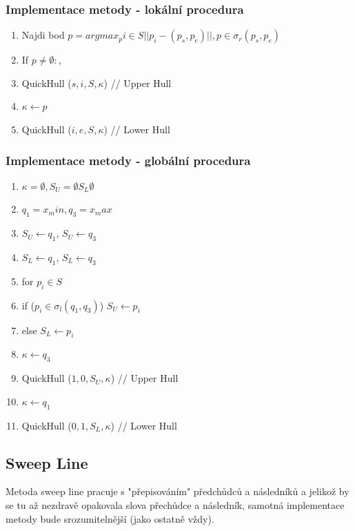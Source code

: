 \documentclass[a4paper, 12pt]{article}
\begin{document}
\subsubsection{Implementace metody - lokální procedura}
\begin{enumerate}
	\item Najdi bod $p = arg max_pi \in S ||p_i - (p_s, p_e)||, p \in \sigma_r (p_s, p_e)$
	\item If $ p\neq\emptyset:$,
	\item \hspace {1cm} QuickHull ($s,i,S,\kappa$) // Upper Hull
	\item \hspace {1cm} $\kappa \longleftarrow p$
	\item \hspace {1cm} QuickHull ($i,e,S,\kappa$) // Lower Hull
\end{enumerate}

\subsubsection{Implementace metody - globální procedura}

\begin{enumerate}
	\item  $\kappa = \emptyset, S_U = \emptyset S_L \emptyset$
	\item $q_1 = x_min, q_3 = x_max$
	\item $S_U \longleftarrow q_1$, $S_U \longleftarrow q_3$
	\item $S_L \longleftarrow q_1$, $S_L \longleftarrow q_3$
	\item for $p_i \in S$
	\item \hspace {1cm} if ($p_i \in \sigma_l (q_1, q_3)$) $S_U \longleftarrow p_i$
	\item \hspace {1cm} else $S_L \longleftarrow p_i$
	\item $\kappa \longleftarrow q_3$
	\item QuickHull ($1,0,S_U,\kappa$) // Upper Hull
	\item $\kappa \longleftarrow q_1$
	\item QuickHull ($0,1,S_L,\kappa$) // Lower Hull
\end{enumerate}
\clearpage

\subsection{Sweep Line}
Metoda sweep line pracuje s "přepisováním" předchůdců a  následníků a jelikož by se tu až nezdravě opakovala slova přechůdce a následník, samotná implementace metody bude srozumitelnější (jako ostatně vždy).
\end{document}
